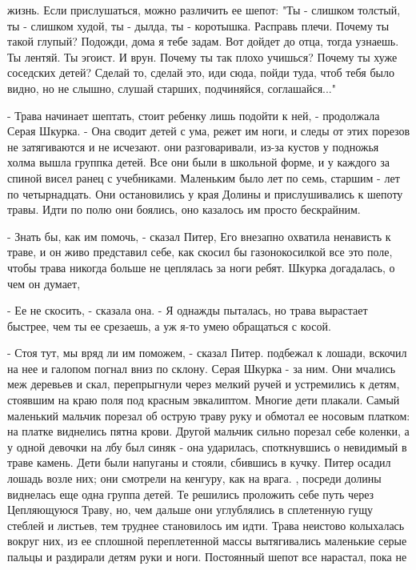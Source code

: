 жизнь. Если прислушаться, можно различить ее шепот: "Ты - слишком 
толстый, ты - слишком худой, ты - дылда, ты - коротышка. Расправь 
плечи. Почему ты такой глупый? Подожди, дома я тебе задам. Вот дойдет 
до отца, тогда узнаешь. Ты лентяй. Ты эгоист. И врун. Почему ты так 
плохо учишься? Почему ты хуже соседских детей? Сделай то, сделай это, 
иди сюда, пойди туда, чтоб тебя было видно, но не слышно, слушай 
старших, подчиняйся, соглашайся..."
\par- Трава начинает шептать, стоит ребенку лишь подойти к ней, - 
продолжала Серая Шкурка. - Она сводит детей с ума, режет им ноги, и 
следы от этих порезов не затягиваются и не исчезают.
 они разговаривали, из-за кустов у подножья холма вышла 
группка детей. Все они были в школьной форме, и у каждого за спиной 
висел ранец с учебниками. Маленьким было лет по семь, старшим - лет по 
четырнадцать. Они остановились у края Долины и прислушивались к шепоту 
травы. Идти по полю они боялись, оно казалось им просто бескрайним.
\par- Знать бы, как им помочь, - сказал Питер, Его внезапно охватила 
ненависть к траве, и он живо представил себе, как скосил бы 
газонокосилкой все это поле, чтобы трава никогда больше не цеплялась 
за ноги ребят.
 Шкурка догадалась, о чем он думает,
\par- Ее не скосить, - сказала она. - Я однажды пыталась, но трава 
вырастает быстрее, чем ты ее срезаешь, а уж я-то умею обращаться с 
косой.
\par- Стоя тут, мы вряд ли им поможем, - сказал Питер.
 подбежал к лошади, вскочил на нее и галопом погнал вниз по 
склону. Серая Шкурка - за ним. Они мчались меж деревьев и скал, 
перепрыгнули через мелкий ручей и устремились к детям, стоявшим на 
краю поля под красным эвкалиптом. Многие дети плакали. Самый маленький 
мальчик порезал об острую траву руку и обмотал ее носовым платком: на 
платке виднелись пятна крови. Другой мальчик сильно порезал себе 
коленки, а у одной девочки на лбу был синяк - она ударилась, 
споткнувшись о невидимый в траве камень. Дети были напуганы и стояли, 
сбившись в кучку. Питер осадил лошадь возле них; они смотрели на 
кенгуру, как на врага.
, посреди долины виднелась еще одна группа детей. Те 
решились проложить себе путь через Цепляющуюся Траву, но, чем дальше 
они углублялись в сплетенную гущу стеблей и листьев, тем труднее 
становилось им идти. Трава неистово колыхалась вокруг них, из ее 
сплошной переплетенной массы вытягивались маленькие серые пальцы и 
раздирали детям руки и ноги. Постоянный шепот все нарастал, пока не 
